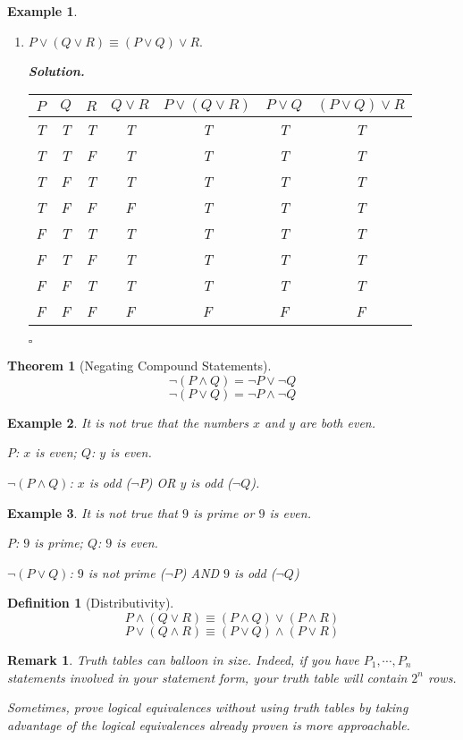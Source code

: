 \documentclass[12pt,a4paper]{article}
\newtheorem{thm}{Theorem}[subsection]
\newtheorem{df}{Definition}[subsection]
\newtheorem{eg}{Example}[subsection]
\newenvironment*{sol}{\par\indent\textbf{\textit{Solution. }}}{\hfill{$\square$}\par}
\newtheorem*{rmk}{\indent Remark}
\begin{document}
\begin{eg}
\begin{enumerate}
		\item $P\vee(Q\vee R)\equiv(P\vee Q)\vee R.$
		\begin{sol}\begin{center}\begin{tabular}{c|c|c|c|c|c|c}
			$P$&$Q$&$R$&$Q\vee R$&$P\vee(Q\vee R)$&$P\vee Q$&$(P\vee Q)\vee R$\\
			\hline
			T&T&T&T&T&T&T\\
			T&T&F&T&T&T&T\\
			T&F&T&T&T&T&T\\
			T&F&F&F&T&T&T\\
			F&T&T&T&T&T&T\\
			F&T&F&T&T&T&T\\
			F&F&T&T&T&T&T\\
			F&F&F&F&F&F&F
		\end{tabular}\end{center}\end{sol}
	\end{enumerate}	
\end{eg}
\begin{thm}[Negating Compound Statements]
	\[\neg(P\wedge Q)=\neg P\vee\neg Q\]	
	\[\neg(P\vee Q)=\neg P\wedge\neg Q\]
\end{thm}
\begin{eg}
	It is not true that the numbers $x$ and $y$ are both even. 
	
	$P$: $x$ is even; $Q$: $y$ is even.
	
	$\neg(P\wedge Q)$: $x$ is odd ($\neg P$) OR $y$ is odd ($\neg Q$).	
\end{eg}
\begin{eg}
	It is not true that $9$ is prime or $9$ is even. 
	
	$P$: $9$ is prime; $Q$: $9$ is even.
	
	$\neg(P\vee Q)$: $9$ is not prime ($\neg P$) AND $9$ is odd ($\neg Q$)	
\end{eg}
\begin{df}[Distributivity]
	\[P\wedge (Q\vee R)\equiv(P\wedge Q)\vee(P\wedge R)\]
	\[P\vee (Q\wedge R)\equiv(P\vee Q)\wedge(P\vee R)\]
\end{df}
\begin{rmk}
	Truth tables can balloon in size. Indeed, if you have $P_1,\cdots,P_n$ statements involved in your statement form, your truth table will contain $2^n$ rows. 
	
	Sometimes, prove logical equivalences without using truth tables by taking advantage of the logical equivalences already proven is more approachable. 
\end{rmk}
\end{document}
